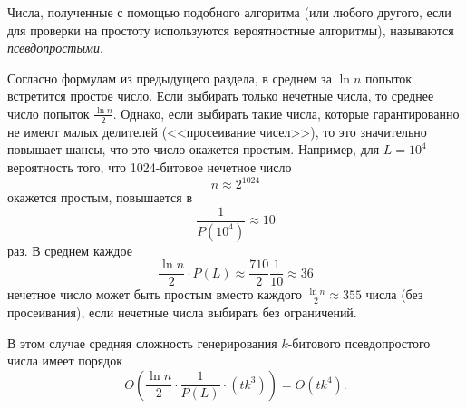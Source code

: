 Числа, полученные с помощью подобного алгоритма (или любого другого, если для проверки на простоту используются вероятностные алгоритмы), называются \emph{псевдопростыми}.

Согласно формулам из предыдущего раздела, в среднем за $\ln n$ попыток встретится простое число. Если выбирать только нечетные числа, то среднее число попыток $\frac{\ln n}{2}$. Однако, если выбирать такие числа, которые гарантированно не имеют малых делителей (<<просеивание чисел>>), то это значительно повышает шансы, что это число окажется простым. Например, для $L = 10^4$ вероятность того, что 1024-битовое нечетное число
    \[ n \approx 2^{1024} \]
окажется простым, повышается в
    \[ \frac{1}{P(10^4)} \approx 10 \]
раз. В среднем каждое
    \[ \frac{\ln n}{2} \cdot P(L) \approx \frac{710}{2} \frac{1}{10} \approx 36 \]
нечетное число может быть простым вместо каждого $\frac{\ln n}{2} \approx 355$ числа (без просеивания), если нечетные числа выбирать без ограничений.

В этом случае средняя сложность генерирования $k$-битового псевдопростого числа имеет порядок
    \[ O \left( \frac{\ln n}{2} \cdot \frac{1}{P(L)} \cdot \left( t k^3 \right) \right) = O(t k^4). \]
